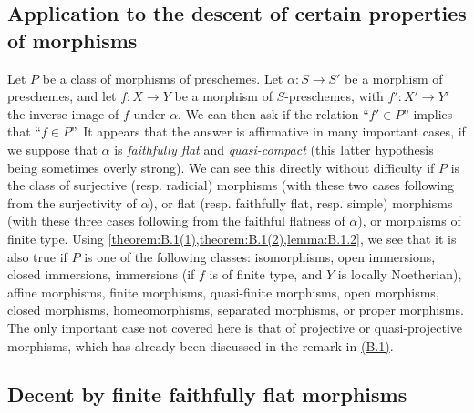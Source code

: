 \documentclass{article}
\theoremstyle{plain}
\theoremstyle{definition}
\newcommand{\oldpage}[1]{\marginpar{\footnotesize$\Big\vert$ \textit{p.~#1}}}
\begin{document}
\subsection{Application to the descent of certain properties of morphisms}
\label{B.2}

Let $P$ be a class of morphisms of preschemes.
Let $\alpha\colon S\to S'$ be a morphism of preschemes, and let $f\colon X\to Y$ be a morphism of $S$-preschemes, with $f'\colon X'\to Y'$ the inverse image of $f$ under $\alpha$.
We can then ask if the relation ``$f'\in P$'' implies that ``$f\in P$''.
It appears that the answer is affirmative in many important cases, if we suppose that $\alpha$ is \emph{faithfully flat} and \emph{quasi-compact} (this latter hypothesis being sometimes overly strong).
We can see this directly without difficulty if $P$ is the class of surjective (resp. radicial) morphisms (with these two cases following from the surjectivity of $\alpha$), or flat (resp. faithfully flat, resp. simple) morphisms (with these three cases following from the faithful flatness of $\alpha$), or morphisms of finite type.
Using \cref{theorem:B.1(1),theorem:B.1(2),lemma:B.1.2}, we see that it is also true if $P$ is one of the following classes:
isomorphisms, open immersions, closed immersions, immersions (if $f$ is of finite type, and $Y$ is locally Noetherian), affine morphisms, finite morphisms, quasi-finite morphisms, open morphisms, closed morphisms, homeomorphisms, separated morphisms,
\oldpage{190-21}
or proper morphisms.
The only important case not covered here is that of projective or quasi-projective morphisms, which has already been discussed in the remark in \hyperref[B.1]{(B.1)}.


\subsection{Decent by finite faithfully flat morphisms}
\label{B.3}





\end{document}
